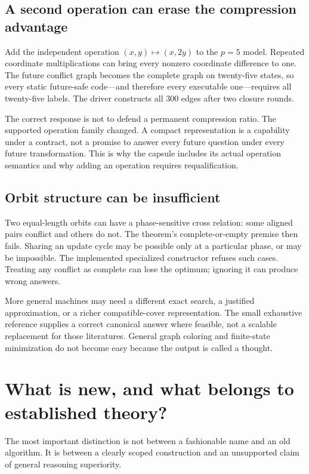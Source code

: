 \documentclass[11pt,letterpaper]{article}
\theoremstyle{remark}\newtheorem{remark}{Remark}[section]
\begin{document}
\subsection{A second operation can erase the compression advantage}
Add the independent operation $(x,y)\mapsto(x,2y)$ to the $p=5$ model. Repeated coordinate multiplications can bring every nonzero coordinate difference to one. The future conflict graph becomes the complete graph on twenty-five states, so every static future-safe code---and therefore every executable one---requires all twenty-five labels. The driver constructs all 300 edges after two closure rounds.

The correct response is not to defend a permanent compression ratio. The supported operation family changed. A compact representation is a capability under a contract, not a promise to answer every future question under every future transformation. This is why the capsule includes its actual operation semantics and why adding an operation requires requalification.

\subsection{Orbit structure can be insufficient}
Two equal-length orbits can have a phase-sensitive cross relation: some aligned pairs conflict and others do not. The theorem's complete-or-empty premise then fails. Sharing an update cycle may be possible only at a particular phase, or may be impossible. The implemented specialized constructor refuses such cases. Treating any conflict as complete can lose the optimum; ignoring it can produce wrong answers.

More general machines may need a different exact search, a justified approximation, or a richer compatible-cover representation. The small exhaustive reference supplies a correct canonical answer where feasible, not a scalable replacement for those literatures. General graph coloring and finite-state minimization do not become easy because the output is called a thought.

\section{What is new, and what belongs to established theory?}
\label{sec:prior}
The most important distinction is not between a fashionable name and an old algorithm. It is between a clearly scoped construction and an unsupported claim of general reasoning superiority.
\end{document}
